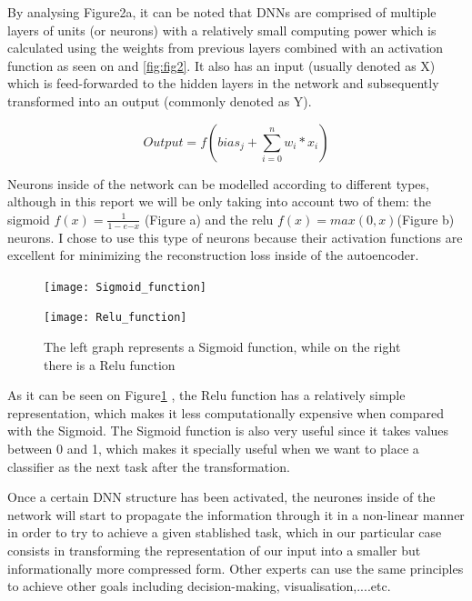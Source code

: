 By analysing Figure2a, it can be noted that DNNs are comprised of multiple layers of units (or neurons) with a relatively small computing power which is calculated using the weights from previous layers combined with an activation function as seen on and \ref{fig:fig2}. It also has an input (usually denoted as X) which is feed-forwarded to the hidden layers in the network and subsequently transformed into an output (commonly denoted as Y). 

\begin{equation}\label{eq:artificial neuron}
Output = f( bias_j + \sum_{i = 0}^{n} w_{i}*x_i ) 
\end{equation}


Neurons inside of the network can be modelled according to different types, although in this report we will be only taking into account two of them: the sigmoid $f(x) = \frac{1}{1 - e{-x}}$ (Figure a) and the relu $f(x) = max(0,x)$(Figure b) neurons. I chose to use this type of neurons because their activation functions are excellent for minimizing the reconstruction loss inside of the autoencoder. \newline

\begin{figure}[H]
 \begin{minipage}{.5\textwidth}
        \texttt{[image: Sigmoid\_function]}
 \end{minipage}%
 \begin{minipage}{.5\textwidth}
        \begin{flushright}
               \texttt{[image: Relu\_function]}  
        \end{flushright} 
    \end{minipage}  
    \caption{The left graph represents a Sigmoid function, while on the right there is a Relu function}
 \label{fig:fig3}
\end{figure}

As it can be seen on Figure\ref{fig:fig3} , the Relu function has a relatively simple representation, which makes it less computationally expensive when compared with the Sigmoid. The Sigmoid function is also very useful since it takes values between 0 and 1, which makes it specially useful when we want to place a classifier as the next task after the transformation.\par 

Once a certain DNN structure has been activated, the neurones inside of the network will start to propagate the information through it in a non-linear manner in order to try to achieve a given stablished task, which in our particular case consists in transforming the representation of our input into a smaller but informationally more compressed form. Other experts can use the same principles to achieve other goals including decision-making, visualisation,....etc.\par

